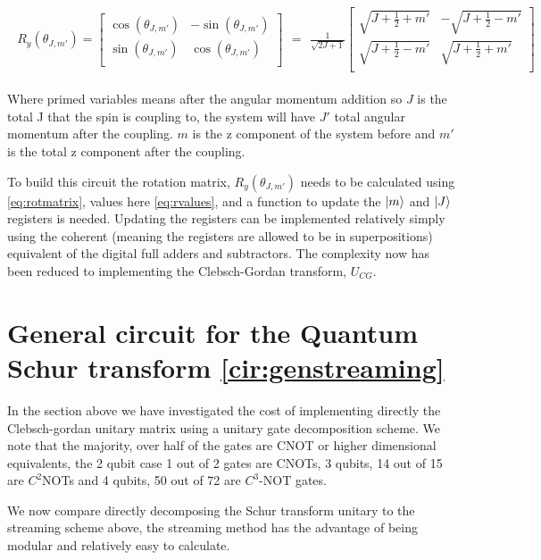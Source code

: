 \documentclass[12pt]{article}
\begin{document}
\begin{align}
\begin{split}
R_y(\theta_{J,m'})=
\begin{bmatrix}
\cos(\theta_{J,m'}) &-\sin(\theta_{J,m'}) \\
\sin(\theta_{J,m'}) & \cos(\theta_{J,m'}) \\
\end{bmatrix}
\end{split}
=
\begin{split}
\frac{1}{\sqrt{2J+1}}
\begin{bmatrix}
\sqrt{J+\frac{1}{2}+m'} &-\sqrt{J+\frac{1}{2}-m'} \\
\sqrt{J+\frac{1}{2}-m'} & \sqrt{J+\frac{1}{2}+m'} \\
\end{bmatrix}
\end{split}
\label{eq:rotmatrix}
\end{align}

Where primed variables means after the angular momentum addition so $J$ is the total J that the spin is coupling to, the system will have $J'$ total angular momentum after the coupling. $m$ is the z component of the system before and $m'$ is the total z component after the coupling.

To build this circuit the rotation matrix, $R_y(\theta_{J,m'})$ needs to be calculated using \autoref{eq:rotmatrix}, values here \autoref{eq:rvalues}, and a function to update the $\left\vert{m}\right\rangle$ and $\left\vert{J}\right\rangle$ registers is needed. Updating the registers can be implemented relatively simply using the coherent (meaning the registers are allowed to be in superpositions) equivalent of the digital full adders and subtractors. The complexity now has been reduced to implementing the Clebsch-Gordan transform, $U_{CG}$.

\section{General circuit for the Quantum Schur transform \autoref{cir:genstreaming}}

In the section above we have investigated the cost of implementing directly the Clebsch-gordan unitary matrix using a unitary gate decomposition scheme. We note that the majority, over half of the gates are CNOT or higher dimensional equivalents, the 2 qubit case 1 out of 2 gates are CNOTs, 3 qubits, 14 out of 15 are $C^2$NOTs and 4 qubits, 50 out of 72 are $C^3$-NOT gates. 

We now compare directly decomposing the Schur transform unitary to the streaming scheme above, the streaming method has the advantage of being modular and relatively easy to calculate.  
\end{document}
